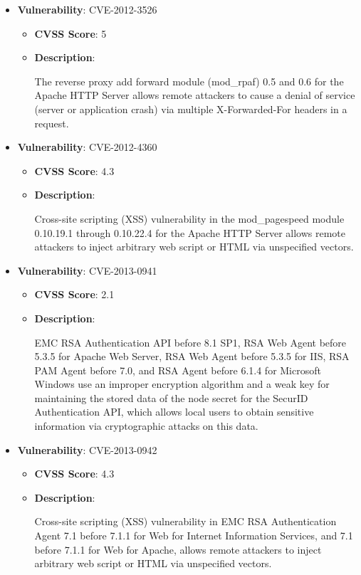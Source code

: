 \documentclass{article}
\begin{document}
\begin{itemize}
        \item \textbf{Vulnerability}: CVE-2012-3526
        \begin{itemize}
            \item \textbf{CVSS Score}:  5 
            \item \textbf{Description}:
            \parbox[t]{0.9\linewidth}{
                \ttfamily The reverse proxy add forward module (mod\_rpaf) 0.5 and 0.6 for the Apache HTTP Server allows remote attackers to cause a denial of service (server or application crash) via multiple X-Forwarded-For headers in a request.
            }
        \end{itemize}
    
        \item \textbf{Vulnerability}: CVE-2012-4360
        \begin{itemize}
            \item \textbf{CVSS Score}:  4.3 
            \item \textbf{Description}:
            \parbox[t]{0.9\linewidth}{
                \ttfamily Cross-site scripting (XSS) vulnerability in the mod\_pagespeed module 0.10.19.1 through 0.10.22.4 for the Apache HTTP Server allows remote attackers to inject arbitrary web script or HTML via unspecified vectors.
            }
        \end{itemize}
    
        \item \textbf{Vulnerability}: CVE-2013-0941
        \begin{itemize}
            \item \textbf{CVSS Score}:  2.1 
            \item \textbf{Description}:
            \parbox[t]{0.9\linewidth}{
                \ttfamily EMC RSA Authentication API before 8.1 SP1, RSA Web Agent before 5.3.5 for Apache Web Server, RSA Web Agent before 5.3.5 for IIS, RSA PAM Agent before 7.0, and RSA Agent before 6.1.4 for Microsoft Windows use an improper encryption algorithm and a weak key for maintaining the stored data of the node secret for the SecurID Authentication API, which allows local users to obtain sensitive information via cryptographic attacks on this data.
            }
        \end{itemize}
    
        \item \textbf{Vulnerability}: CVE-2013-0942
        \begin{itemize}
            \item \textbf{CVSS Score}:  4.3 
            \item \textbf{Description}:
            \parbox[t]{0.9\linewidth}{
                \ttfamily Cross-site scripting (XSS) vulnerability in EMC RSA Authentication Agent 7.1 before 7.1.1 for Web for Internet Information Services, and 7.1 before 7.1.1 for Web for Apache, allows remote attackers to inject arbitrary web script or HTML via unspecified vectors.
            }
        \end{itemize}
    

\end{itemize}
\end{document}
